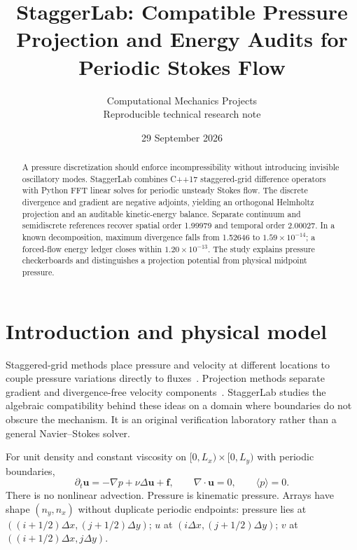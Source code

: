 \documentclass[10pt,a4paper]{article}
\title{\vspace{-1.3cm}\LARGE StaggerLab: Compatible Pressure Projection and Energy Audits for Periodic Stokes Flow}
\author{\small Computational Mechanics Projects\\\small Reproducible technical research note}
\date{\small 29 September 2026}
\begin{document}
\maketitle\thispagestyle{fancy}

\begin{abstract}
A pressure discretization should enforce incompressibility without introducing invisible oscillatory modes. StaggerLab combines C++17 staggered-grid difference operators with Python FFT linear solves for periodic unsteady Stokes flow. The discrete divergence and gradient are negative adjoints, yielding an orthogonal Helmholtz projection and an auditable kinetic-energy balance. Separate continuum and semidiscrete references recover spatial order 1.99979 and temporal order 2.00027. In a known decomposition, maximum divergence falls from 1.52646 to $1.59\times10^{-14}$; a forced-flow energy ledger closes within $1.20\times10^{-13}$. The study explains pressure checkerboards and distinguishes a projection potential from physical midpoint pressure.
\end{abstract}
\section{Introduction and physical model}
Staggered-grid methods place pressure and velocity at different locations to couple pressure variations directly to fluxes~\cite{mac}. Projection methods separate gradient and divergence-free velocity components~\cite{chorin}. StaggerLab studies the algebraic compatibility behind these ideas on a domain where boundaries do not obscure the mechanism. It is an original verification laboratory rather than a general Navier--Stokes solver.

For unit density and constant viscosity on $[0,L_x)\times[0,L_y)$ with periodic boundaries,
\begin{equation}
\partial_t\mathbf u=-\nabla p+\nu\Delta\mathbf u+\mathbf f,
\qquad\nabla\cdot\mathbf u=0,\qquad\langle p\rangle=0.
\end{equation}
There is no nonlinear advection. Pressure is kinematic pressure. Arrays have shape $(n_y,n_x)$ without duplicate periodic endpoints: pressure lies at $((i+1/2)\Delta x,(j+1/2)\Delta y)$; $u$ at $(i\Delta x,(j+1/2)\Delta y)$; $v$ at $((i+1/2)\Delta x,j\Delta y)$.
\end{document}
